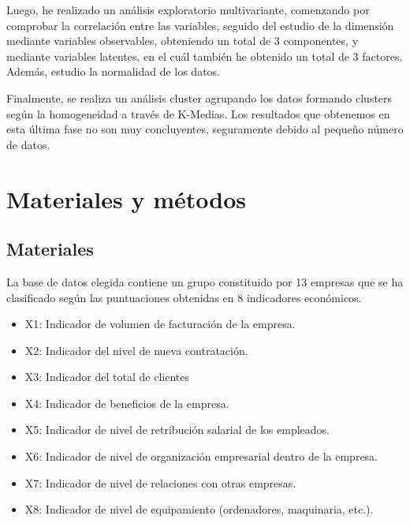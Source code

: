 \documentclass[11pt,a4paper]{article}
\begin{document}
Luego, he realizado un análisis exploratorio multivariante, comenzando por comprobar la correlación entre las variables, seguido del estudio de la dimensión mediante variables observables, obteniendo un total de 3 componentes, y mediante variables latentes, en el cuál también he obtenido un total de 3 factores. Además, estudio la normalidad de los datos.

Finalmente, se realiza un análisis cluster agrupando los datos formando clusters según la homogeneidad a través de K-Medias. Los resultados que obtenemos en esta última fase no son muy concluyentes, seguramente debido al pequeño número de datos.

\section{Materiales y métodos}
\subsection{Materiales}
La base de datos elegida contiene un grupo constituido por 13 empresas que se ha clasificado según las puntuaciones obtenidas en 8 indicadores económicos.
\begin{itemize}
\item X1: Indicador de volumen de facturación de la empresa.
\item X2: Indicador del nivel de nueva contratación.
\item X3: Indicador del total de clientes
\item X4: Indicador de beneficios de la empresa.
\item X5: Indicador de nivel de retribución salarial de los empleados.
\item X6: Indicador de nivel de organización empresarial dentro de la empresa.
\item X7: Indicador de nivel de relaciones con otras empresas.
\item X8: Indicador de nivel de equipamiento (ordenadores, maquinaria, etc.).
\end{itemize}
\end{document}
